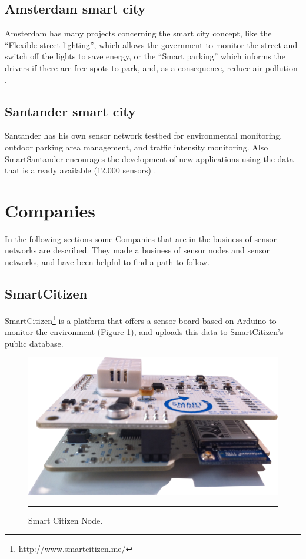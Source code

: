 \documentclass[12pt, a4paper,twoside]{tesi_upf}
\begin{document}
    \subsection{Amsterdam smart city}
      Amsterdam has many projects concerning the smart city concept, like the ``Flexible street lighting'', which allows the government to monitor the street and switch off the lights to save energy, or the ``Smart parking'' which informs the drivers if there are free spots to park, and, as a consequence, reduce air pollution \cite{SmartcityAmsterdam}.
      
    \subsection{Santander smart city}
      Santander has his own sensor network testbed for environmental monitoring, outdoor parking area management, and traffic intensity monitoring. Also SmartSantander encourages the development of new applications using the data that is already available (12.000 sensors) \cite{SmartcitySantander}.
    
  \section{Companies}
    In the following sections some Companies that are in the business of sensor networks are described. They made a business of sensor nodes and sensor networks, and have been helpful to find a path to follow.
    
    \subsection{SmartCitizen}
      SmartCitizen\footnote{\url{http://www.smartcitizen.me/}} is a platform that offers a sensor board based on Arduino to monitor the environment (Figure \ref{fig:SmartCitizenNode}), and uploads this data to SmartCitizen's public database.
      
      \begin{figure}[htbp]
        \centering
            \includegraphics[scale=0.08]{./Figures/smartcitizen.png}
            \rule{18em}{0.5pt}
        \caption[Smart Citizen Node]{Smart Citizen Node.}
        \label{fig:SmartCitizenNode}
    \end{figure}
            
\end{document}
